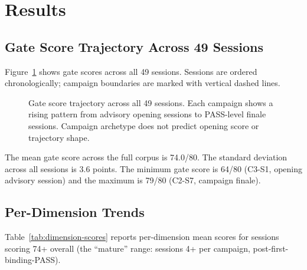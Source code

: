
\section{Results}
\label{sec:results}

\subsection{Gate Score Trajectory Across 49 Sessions}

Figure~\ref{fig:gate-trajectory} shows gate scores across all 49 sessions. Sessions
are ordered chronologically; campaign boundaries are marked with vertical dashed lines.

\begin{figure}[t]
  \centering
  \caption{Gate score trajectory across all 49 sessions. Each campaign shows a rising
    pattern from advisory opening sessions to PASS-level finale sessions. Campaign
    archetype does not predict opening score or trajectory shape.}
  \label{fig:gate-trajectory}
\end{figure}

The mean gate score across the full corpus is 74.0/80. The standard deviation across
all sessions is 3.6 points. The minimum gate score is 64/80 (C3-S1, opening advisory
session) and the maximum is 79/80 (C2-S7, campaign finale).

\subsection{Per-Dimension Trends}

Table~\ref{tab:dimension-scores} reports per-dimension mean scores for sessions
scoring 74+ overall (the ``mature'' range: sessions 4+ per campaign, post-first-binding-PASS).

